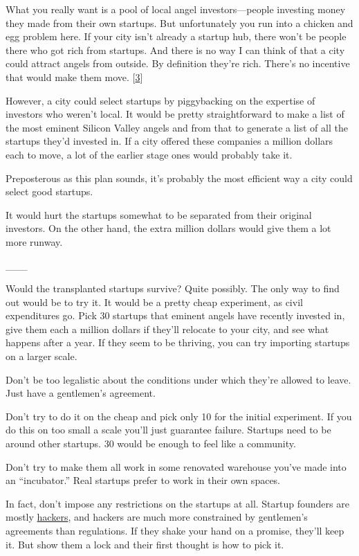 What you really want is a pool of local angel investors---people
investing money they made from their own startups. But unfortunately you
run into a chicken and egg problem here. If your city isn't already a
startup hub, there won't be people there who got rich from startups. And
there is no way I can think of that a city could attract angels from
outside. By definition they're rich. There's no incentive that would
make them move. {[}\hyperref[f3n]{3}{]}

However, a city could select startups by piggybacking on the expertise
of investors who weren't local. It would be pretty straightforward to
make a list of the most eminent Silicon Valley angels and from that to
generate a list of all the startups they'd invested in. If a city
offered these companies a million dollars each to move, a lot of the
earlier stage ones would probably take it.

Preposterous as this plan sounds, it's probably the most efficient way a
city could select good startups.

It would hurt the startups somewhat to be separated from their original
investors. On the other hand, the extra million dollars would give them
a lot more runway.

\_\_\_

Would the transplanted startups survive? Quite possibly. The only way to
find out would be to try it. It would be a pretty cheap experiment, as
civil expenditures go. Pick 30 startups that eminent angels have
recently invested in, give them each a million dollars if they'll
relocate to your city, and see what happens after a year. If they seem
to be thriving, you can try importing startups on a larger scale.

Don't be too legalistic about the conditions under which they're allowed
to leave. Just have a gentlemen's agreement.

Don't try to do it on the cheap and pick only 10 for the initial
experiment. If you do this on too small a scale you'll just guarantee
failure. Startups need to be around other startups. 30 would be enough
to feel like a community.

Don't try to make them all work in some renovated warehouse you've made
into an ``incubator.'' Real startups prefer to work in their own spaces.

In fact, don't impose any restrictions on the startups at all. Startup
founders are mostly \href{gba.html}{hackers}, and hackers are much more
constrained by gentlemen's agreements than regulations. If they shake
your hand on a promise, they'll keep it. But show them a lock and their
first thought is how to pick it.

